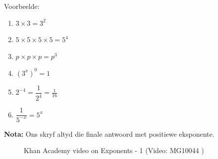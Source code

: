 Voorbeelde:
\begin{enumerate}[noitemsep, label=\textbf{\arabic*.}]
\item $3 \times 3 = 3^2$
\item $5 \times 5 \times 5 \times 5 = 5^4 $
\item $p \times p \times p = p^3$
\item $(3^x)^0 = 1$
\item $ 2^{-4} = \dfrac{1}{2^4} = \frac{1}{16}$
\item $ \dfrac{1}{5^{-x}} = 5^x$
\end{enumerate}

% 
% 
% 
% 
% 
% 
% 
      
\textbf{Nota:} Ons skryf altyd die finale antwoord met positiewe eksponente.


% 
% 
% 
% 

\setcounter{subfigure}{0}
\begin{figure}[H] %
\textnormal{Khan Academy video on Exponents - 1}\vspace{.1in} 
\label{m38359*yt-media1}\label{m38359*yt-video1}
 { (Video:  MG10044 )}
\end{figure}       



